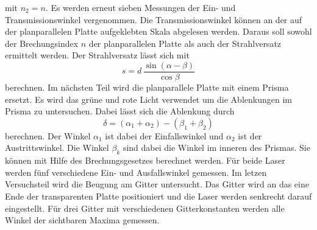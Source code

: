 mit $n_2=n$. Es werden erneut sieben Messungen der Ein- und Transmissionswinkel vergenommen. Die Transmissionswinkel können an der auf der planparallelen Platte aufgeklebten Skala abgelesen werden.
Daraus soll sowohl der Brechungsindex $n$ der planparallelen Platte als auch der Strahlversatz ermittelt werden.
Der Strahlversatz lässt sich mit
\begin{equation}
    s=d \, \frac{\sin\left(\alpha- \beta\right)}{\cos \beta}
    \label{eqn:strahlversatz}
\end{equation}
berechnen. 
Im nächsten Teil wird die planparallele Platte mit einem Prisma ersetzt. Es wird das grüne und rote Licht verwendet um die Ablenkungen im Prisma zu untersuchen. Dabei lässt sich
die Ablenkung durch
\begin{equation}
    \delta= (\alpha_1 + \alpha_2)- (\beta_1+ \beta_2)
    \label{eqn:ablenk}
\end{equation}
berechnen. Der Winkel $\alpha_1$ ist dabei der Einfallswinkel und $\alpha_2$ ist der Austrittswinkel. Die Winkel $\beta_k$ sind dabei die Winkel im inneren des Prismas. Sie können mit Hilfe des Brechungsgesetzes berechnet werden.
Für beide Laser werden fünf verschiedene Ein- und Ausfallswinkel gemessen. 
Im letzen Versuchsteil wird die Beugung am Gitter untersucht. Das Gitter wird an das eine Ende der transparenten Platte positioniert und die Laser werden senkrecht darauf eingestellt.
Für drei Gitter mit verschiedenen Gitterkonstanten werden alle Winkel der sichtbaren Maxima gemessen. 
